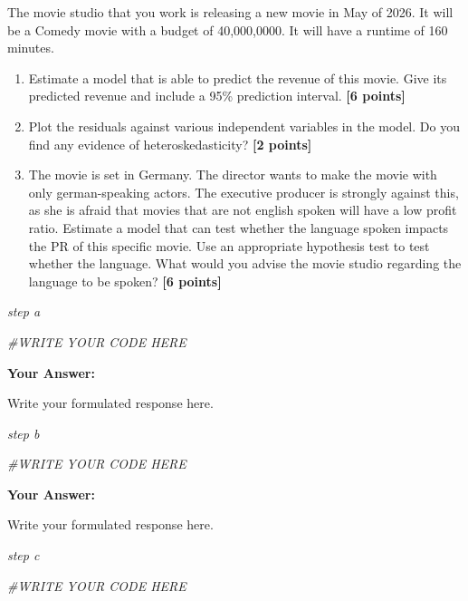 \documentclass[
]{article}
\newenvironment{Shaded}{\begin{snugshade}}{\end{snugshade}}
\newcommand{\CommentTok}[1]{\textcolor[rgb]{0.56,0.35,0.01}{\textit{#1}}}
\providecommand{\tightlist}{%
  \setlength{\itemsep}{0pt}\setlength{\parskip}{0pt}}
\begin{document}
The movie studio that you work is releasing a new movie in May of 2026.
It will be a Comedy movie with a budget of 40,000,0000. It will have a
runtime of 160 minutes.

\begin{enumerate}
\def\labelenumi{\alph{enumi}.}
\setcounter{enumi}{2}
\tightlist
\item
  Estimate a model that is able to predict the revenue of this movie.
  Give its predicted revenue and include a 95\% prediction interval.
  \textbf{[6 points]}
\item
  Plot the residuals against various independent variables in the model.
  Do you find any evidence of heteroskedasticity? \textbf{[2 points]}
\item
  The movie is set in Germany. The director wants to make the movie with
  only german-speaking actors. The executive producer is strongly
  against this, as she is afraid that movies that are not english spoken
  will have a low profit ratio. Estimate a model that can test whether
  the language spoken impacts the PR of this specific movie. Use an
  appropriate hypothesis test to test whether the language. What would
  you advise the movie studio regarding the language to be spoken?
  \textbf{[6 points]}
\end{enumerate}

\emph{step a}

\begin{Shaded}
\begin{Highlighting}[]
\CommentTok{\#WRITE YOUR CODE HERE}
\end{Highlighting}
\end{Shaded}

\textbf{Your Answer:}

Write your formulated response here.

\emph{step b}

\begin{Shaded}
\begin{Highlighting}[]
\CommentTok{\#WRITE YOUR CODE HERE}
\end{Highlighting}
\end{Shaded}

\textbf{Your Answer:}

Write your formulated response here.

\emph{step c}

\begin{Shaded}
\begin{Highlighting}[]
\CommentTok{\#WRITE YOUR CODE HERE}
\end{Highlighting}
\end{Shaded}
\end{document}
